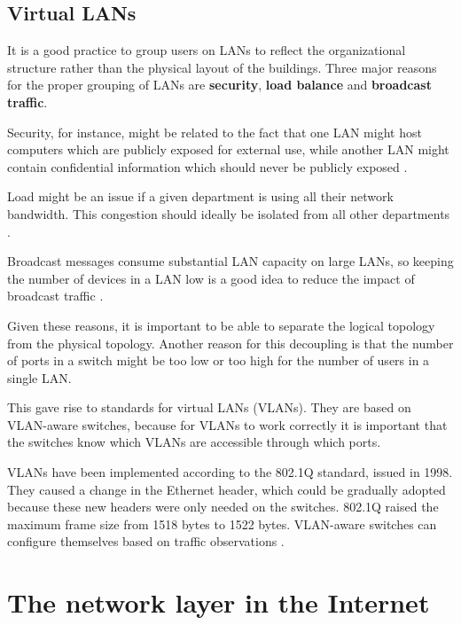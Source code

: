 \documentclass[12pt, oneside]{book}
\begin{document}
\subsection{Virtual LANs}

It is a good practice to group users on LANs to reflect the organizational structure rather than the physical layout of the buildings. Three major reasons for the proper grouping of LANs are \textbf{security}, \textbf{load balance} and \textbf{broadcast traffic}.

Security, for instance, might be related to the fact that one LAN might host computers which are publicly exposed for external use, while another LAN might contain confidential information which should never be publicly exposed  \cite[p.~343]{computer-networks-tanenbaum-2012}.

Load might be an issue if a given department is using all their network bandwidth. This congestion should ideally be isolated from all other departments \cite[p.~344]{computer-networks-tanenbaum-2012}.

Broadcast messages consume substantial LAN capacity on large LANs, so keeping the number of devices in a LAN low is a good idea to reduce the impact of broadcast traffic \cite[p.~344]{computer-networks-tanenbaum-2012}.

Given these reasons, it is important to be able to separate the logical topology from the physical topology.
Another reason for this decoupling is that the number of ports in a switch might be too low or too high for the number of users in a single LAN.

This gave rise to standards for virtual LANs (VLANs). They are based on VLAN-aware switches, because for VLANs to work correctly it is important that the switches know which VLANs are accessible through which ports.

VLANs have been implemented according to the 802.1Q standard, issued in 1998. They caused a change in the Ethernet header, which could be gradually adopted because these new headers were only needed on the switches. 802.1Q raised the maximum frame size from 1518 bytes to 1522 bytes. VLAN-aware switches can configure themselves based on traffic observations \cite[p.~348]{computer-networks-tanenbaum-2012}.

\section{The network layer in the Internet}
\end{document}
